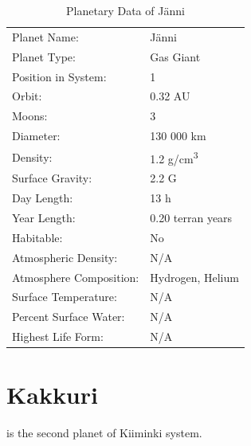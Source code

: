 \documentclass{tufte-book}
\begin{document}
\bigskip
\begin{table}
\begin{minipage}{\textwidth}
\begin{center}
\begin{tabular}{ll}
\toprule
Planet Name: & J\"{a}nni \\
Planet Type: & Gas Giant \\
Position in System: & 1 \\
Orbit: & 0.32 AU \\
Moons: & 3 \\
Diameter: & 130 000 km \\
Density: & 1.2 g/cm\textsuperscript{3} \\
Surface Gravity: & 2.2 G \\
Day Length: & 13 h \\
Year Length: & 0.20 terran years \\
Habitable: & No \\
\quad Atmospheric Density: & N/A \\
\quad Atmosphere Composition: & Hydrogen, Helium \\
\quad Surface Temperature: & N/A \\
\quad Percent Surface Water: & N/A \\
\quad Highest Life Form: & N/A \\

\bottomrule
\end{tabular}
\end{center}
\end{minipage}
\caption{Planetary Data of J\"{a}nni}
\end{table}

\section{Kakkuri}

 is the second planet of Kiiminki system.
\end{document}
